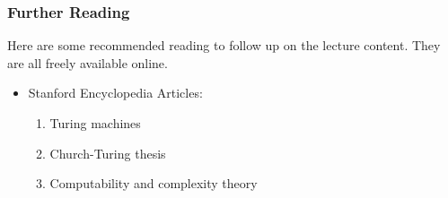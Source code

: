 \documentclass{beamer}
\begin{document}




	





	

\begin{frame}
	\frametitle{Further Reading}
	
	Here are some recommended reading to follow up on the lecture content. They are all freely available online. 
	
	\vspace{0.5cm}
	
	\begin{itemize}
		\item Stanford Encyclopedia Articles: 
			\begin{enumerate}
				\item Turing machines
				\item Church-Turing thesis
				\item Computability and complexity theory
			\end{enumerate}
	\end{itemize}
	
\end{frame}
\end{document}
